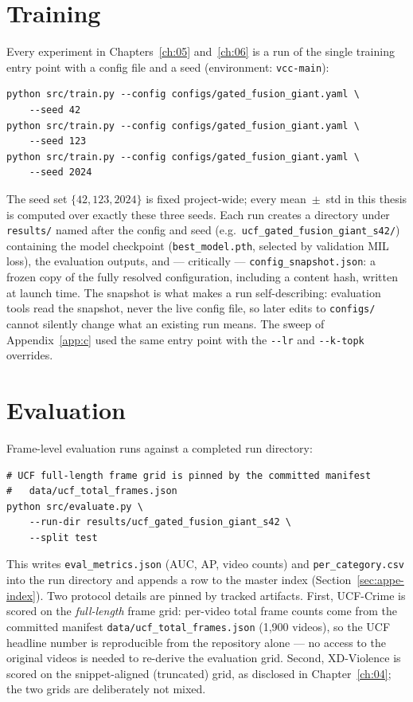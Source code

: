 \section{Training}
\label{sec:appe-train}

Every experiment in Chapters~\ref{ch:05} and~\ref{ch:06} is a run of the
single training entry point with a config file and a seed
(environment: \texttt{vcc-main}):

\begin{verbatim}
python src/train.py --config configs/gated_fusion_giant.yaml \
    --seed 42
python src/train.py --config configs/gated_fusion_giant.yaml \
    --seed 123
python src/train.py --config configs/gated_fusion_giant.yaml \
    --seed 2024
\end{verbatim}

The seed set $\{42, 123, 2024\}$ is fixed project-wide; every mean~$\pm$~std
in this thesis is computed over exactly these three seeds. Each run creates a
directory under \texttt{results/} named after the config and seed (e.g.\
\texttt{ucf\_gated\_fusion\_giant\_s42/}) containing the model checkpoint
(\texttt{best\_model.pth}, selected by validation MIL loss), the evaluation
outputs, and --- critically --- \texttt{config\_snapshot.json}: a frozen copy
of the fully resolved configuration, including a content hash, written at
launch time. The snapshot is what makes a run self-describing: evaluation
tools read the snapshot, never the live config file, so later edits to
\texttt{configs/} cannot silently change what an existing run means. The
sweep of Appendix~\ref{app:c} used the same entry point with the
\texttt{-{}-lr} and \texttt{-{}-k-topk} overrides.

\section{Evaluation}
\label{sec:appe-eval}

Frame-level evaluation runs against a completed run directory:

\begin{verbatim}
# UCF full-length frame grid is pinned by the committed manifest
#   data/ucf_total_frames.json
python src/evaluate.py \
    --run-dir results/ucf_gated_fusion_giant_s42 \
    --split test
\end{verbatim}

This writes \texttt{eval\_metrics.json} (AUC, AP, video counts) and
\texttt{per\_category.csv} into the run directory and appends a row to the
master index (Section~\ref{sec:appe-index}). Two protocol details are pinned
by tracked artifacts. First, UCF-Crime is scored on the \emph{full-length}
frame grid: per-video total frame counts come from the committed manifest
\texttt{data/ucf\_total\_frames.json} (1{,}900 videos), so the UCF headline
number is reproducible from the repository alone --- no access to the original
videos is needed to re-derive the evaluation grid. Second, XD-Violence is
scored on the snippet-aligned (truncated) grid, as disclosed in
Chapter~\ref{ch:04}; the two grids are deliberately not mixed.

